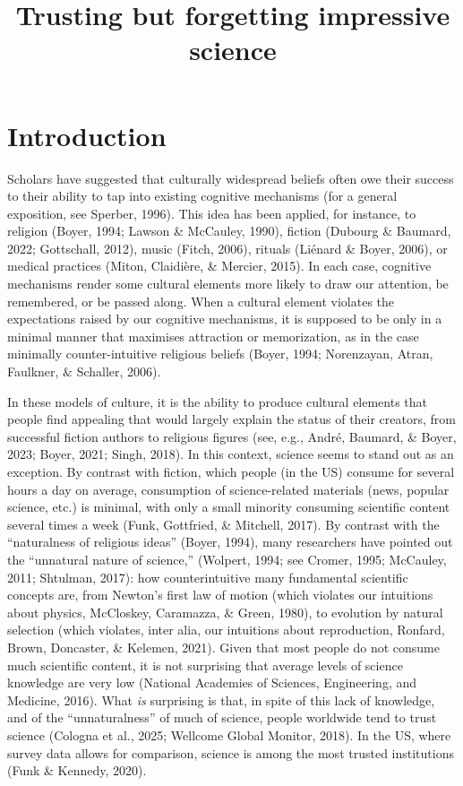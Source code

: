 \documentclass[
  english,
  doc,floatsintext]{apa6}
\title{Trusting but forgetting impressive science}
\author{\textsuperscript{}}
\date{}
\affiliation{\vspace{0.5cm}\textsuperscript{} }
\begin{document}
\maketitle

\section{Introduction}\label{introduction}

Scholars have suggested that culturally widespread beliefs often owe their success to their ability to tap into existing cognitive mechanisms (for a general exposition, see Sperber, 1996). This idea has been applied, for instance, to religion (Boyer, 1994; Lawson \& McCauley, 1990), fiction (Dubourg \& Baumard, 2022; Gottschall, 2012), music (Fitch, 2006), rituals (Liénard \& Boyer, 2006), or medical practices (Miton, Claidière, \& Mercier, 2015). In each case, cognitive mechanisms render some cultural elements more likely to draw our attention, be remembered, or be passed along. When a cultural element violates the expectations raised by our cognitive mechanisms, it is supposed to be only in a minimal manner that maximises attraction or memorization, as in the case minimally counter-intuitive religious beliefs (Boyer, 1994; Norenzayan, Atran, Faulkner, \& Schaller, 2006).

In these models of culture, it is the ability to produce cultural elements that people find appealing that would largely explain the status of their creators, from successful fiction authors to religious figures (see, e.g., André, Baumard, \& Boyer, 2023; Boyer, 2021; Singh, 2018). In this context, science seems to stand out as an exception. By contrast with fiction, which people (in the US) consume for several hours a day on average, consumption of science-related materials (news, popular science, etc.) is minimal, with only a small minority consuming scientific content several times a week (Funk, Gottfried, \& Mitchell, 2017). By contrast with the ``naturalness of religious ideas'' (Boyer, 1994), many researchers have pointed out the ``unnatural nature of science,'' (Wolpert, 1994; see Cromer, 1995; McCauley, 2011; Shtulman, 2017): how counterintuitive many fundamental scientific concepts are, from Newton's first law of motion (which violates our intuitions about physics, McCloskey, Caramazza, \& Green, 1980), to evolution by natural selection (which violates, inter alia, our intuitions about reproduction, Ronfard, Brown, Doncaster, \& Kelemen, 2021). Given that most people do not consume much scientific content, it is not surprising that average levels of science knowledge are very low (National Academies of Sciences, Engineering, and Medicine, 2016). What \emph{is} surprising is that, in spite of this lack of knowledge, and of the ``unnaturalness'' of much of science, people worldwide tend to trust science (Cologna et al., 2025; Wellcome Global Monitor, 2018). In the US, where survey data allows for comparison, science is among the most trusted institutions (Funk \& Kennedy, 2020).
\end{document}
